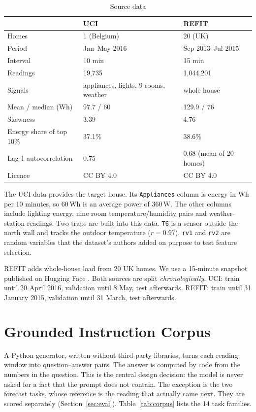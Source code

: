\documentclass[conference]{IEEEtran}
\begin{document}
\begin{table}[t]
\caption{Source data}
\label{tab:datastats}
\centering
\footnotesize
\begin{tabular}{@{}p{2.75cm}p{2.35cm}p{2.35cm}@{}}
\toprule
& UCI \cite{candanedo2017} & REFIT \cite{murray2017refit,rescast} \\
\midrule
Homes & 1 (Belgium) & 20 (UK) \\
Period & Jan--May 2016 & Sep 2013--Jul 2015 \\
Interval & 10 min & 15 min \\
Readings & 19{,}735 & 1{,}044{,}201 \\
Signals & appliances, lights, 9 rooms, weather & whole house \\
Mean / median (Wh) & 97.7 / 60 & 129.9 / 76 \\
Skewness & 3.39 & 4.76 \\
Energy share of top 10\% & 37.1\% & 38.6\% \\
Lag-1 autocorrelation & 0.75 & 0.68 (mean of 20 homes) \\
Licence & CC BY 4.0 & CC BY 4.0 \\
\bottomrule
\end{tabular}
\end{table}

The UCI data \cite{candanedo2017} provides the target house. Its \texttt{Appliances} column is energy in Wh per
10 minutes, so 60\,Wh is an average power of 360\,W. The other columns include lighting energy, nine room
temperature/humidity pairs and weather-station readings. Two traps are built into this data. \texttt{T6} is a sensor
outside the north wall and tracks the outdoor temperature ($r=0.97$). \texttt{rv1} and \texttt{rv2} are random
variables that the dataset's authors added on purpose to test feature selection.

REFIT \cite{murray2017refit} adds whole-house load from 20 UK homes. We use a 15-minute snapshot published on
Hugging Face \cite{rescast}. Both sources are split \emph{chronologically}. UCI: train until 20 April 2016,
validation until 8 May, test afterwards. REFIT: train until 31 January 2015, validation until 31 March, test
afterwards.

\section{Grounded Instruction Corpus}

A Python generator, written without third-party libraries, turns each reading window into question--answer
pairs. The answer is computed by code from the numbers in the question. This is the central design decision: the
model is never asked for a fact that the prompt does not contain. The exception is the two forecast tasks, whose
reference is the reading that actually came next. They are scored separately (Section~\ref{sec:eval}).
Table~\ref{tab:corpus} lists the 14 task families.
\end{document}
